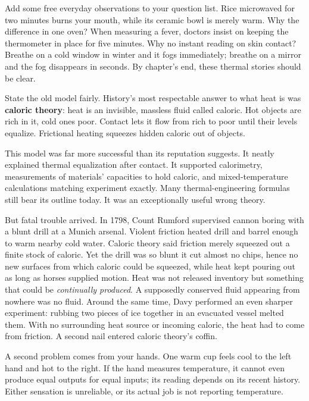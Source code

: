 Add some free everyday observations to your question list. Rice microwaved for two minutes burns your mouth, while its ceramic bowl is merely warm. Why the difference in one oven? When measuring a fever, doctors insist on keeping the thermometer in place for five minutes. Why no instant reading on skin contact? Breathe on a cold window in winter and it fogs immediately; breathe on a mirror and the fog disappears in seconds. By chapter's end, these thermal stories should be clear.


State the old model fairly. History's most respectable answer to what heat is was \textbf{caloric theory}: heat is an invisible, massless fluid called caloric. Hot objects are rich in it, cold ones poor. Contact lets it flow from rich to poor until their levels equalize. Frictional heating squeezes hidden caloric out of objects.

This model was far more successful than its reputation suggests. It neatly explained thermal equalization after contact. It supported calorimetry, measurements of materials' capacities to hold caloric, and mixed-temperature calculations matching experiment exactly. Many thermal-engineering formulas still bear its outline today. It was an exceptionally useful wrong theory.

But fatal trouble arrived. In 1798, Count Rumford supervised cannon boring with a blunt drill at a Munich arsenal. Violent friction heated drill and barrel enough to warm nearby cold water. Caloric theory said friction merely squeezed out a finite stock of caloric. Yet the drill was so blunt it cut almost no chips, hence no new surfaces from which caloric could be squeezed, while heat kept pouring out as long as horses supplied motion. Heat was not released inventory but something that could be \emph{continually produced}. A supposedly conserved fluid appearing from nowhere was no fluid. Around the same time, Davy performed an even sharper experiment: rubbing two pieces of ice together in an evacuated vessel melted them. With no surrounding heat source or incoming caloric, the heat had to come from friction. A second nail entered caloric theory's coffin.

A second problem comes from your hands. One warm cup feels cool to the left hand and hot to the right. If the hand measures temperature, it cannot even produce equal outputs for equal inputs; its reading depends on its recent history. Either sensation is unreliable, or its actual job is not reporting temperature.

